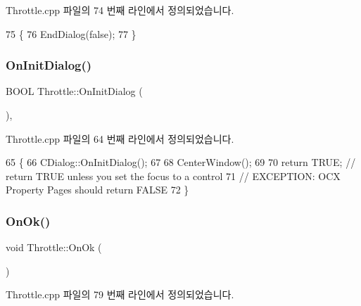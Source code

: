 Throttle.\+cpp 파일의 74 번째 라인에서 정의되었습니다.


\begin{DoxyCode}
75 \{
76   EndDialog(\textcolor{keyword}{false});
77 \}
\end{DoxyCode}
\mbox{\label{class_throttle_ac091cd673324246105b4c3d76e25e894}} 
\subsubsection{\texorpdfstring{On\+Init\+Dialog()}{OnInitDialog()}}
{\footnotesize\ttfamily B\+O\+OL Throttle\+::\+On\+Init\+Dialog (\begin{DoxyParamCaption}{ }\end{DoxyParamCaption})\hspace{0.3cm}{\ttfamily [protected]}, {\ttfamily [virtual]}}



Throttle.\+cpp 파일의 64 번째 라인에서 정의되었습니다.


\begin{DoxyCode}
65 \{
66   CDialog::OnInitDialog();
67   
68   CenterWindow();
69   
70   \textcolor{keywordflow}{return} TRUE;  \textcolor{comment}{// return TRUE unless you set the focus to a control}
71                 \textcolor{comment}{// EXCEPTION: OCX Property Pages should return FALSE}
72 \}
\end{DoxyCode}
\mbox{\label{class_throttle_ae8947386977fc3c1e47bea6f3ddb07b8}} 
\subsubsection{\texorpdfstring{On\+Ok()}{OnOk()}}
{\footnotesize\ttfamily void Throttle\+::\+On\+Ok (\begin{DoxyParamCaption}{ }\end{DoxyParamCaption})\hspace{0.3cm}{\ttfamily [protected]}}



Throttle.\+cpp 파일의 79 번째 라인에서 정의되었습니다.


